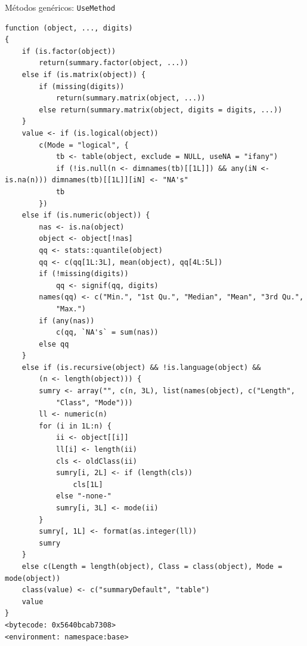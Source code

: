 \documentclass[xcolor={usenames,svgnames,dvipsnames}]{beamer}
\begin{document}
\begin{frame}[fragile,label={sec:org3d860a1}]{Métodos genéricos: \texttt{UseMethod}}
\begin{verbatim}
function (object, ..., digits) 
{
    if (is.factor(object)) 
        return(summary.factor(object, ...))
    else if (is.matrix(object)) {
        if (missing(digits)) 
            return(summary.matrix(object, ...))
        else return(summary.matrix(object, digits = digits, ...))
    }
    value <- if (is.logical(object)) 
        c(Mode = "logical", {
            tb <- table(object, exclude = NULL, useNA = "ifany")
            if (!is.null(n <- dimnames(tb)[[1L]]) && any(iN <- is.na(n))) dimnames(tb)[[1L]][iN] <- "NA's"
            tb
        })
    else if (is.numeric(object)) {
        nas <- is.na(object)
        object <- object[!nas]
        qq <- stats::quantile(object)
        qq <- c(qq[1L:3L], mean(object), qq[4L:5L])
        if (!missing(digits)) 
            qq <- signif(qq, digits)
        names(qq) <- c("Min.", "1st Qu.", "Median", "Mean", "3rd Qu.", 
            "Max.")
        if (any(nas)) 
            c(qq, `NA's` = sum(nas))
        else qq
    }
    else if (is.recursive(object) && !is.language(object) && 
        (n <- length(object))) {
        sumry <- array("", c(n, 3L), list(names(object), c("Length", 
            "Class", "Mode")))
        ll <- numeric(n)
        for (i in 1L:n) {
            ii <- object[[i]]
            ll[i] <- length(ii)
            cls <- oldClass(ii)
            sumry[i, 2L] <- if (length(cls)) 
                cls[1L]
            else "-none-"
            sumry[i, 3L] <- mode(ii)
        }
        sumry[, 1L] <- format(as.integer(ll))
        sumry
    }
    else c(Length = length(object), Class = class(object), Mode = mode(object))
    class(value) <- c("summaryDefault", "table")
    value
}
<bytecode: 0x5640bcab7308>
<environment: namespace:base>
\end{verbatim}
\end{frame}
\end{document}
